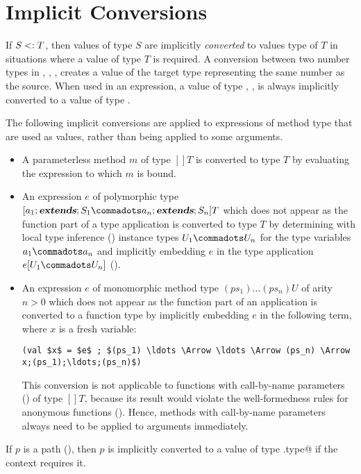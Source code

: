 \documentclass[11pt]{report}
\begin{document}
\section{Implicit Conversions}
\label{sec:impl-conv}

If $S <: T$, then values of type $S$ are implicitly {\em
converted} to values type of $T$ in situations where a value of type
$T$ is required. A conversion between two number types in \verb@Int@,
\verb@Long@, \verb@Float@, \verb@Double@ creates a value of the target
type representing the same number as the source.  When used in an
expression, a value of type \verb@Byte@, \verb@Char@, \verb@Short@ is
always implicitly converted to a value of type \verb@Int@.

The following implicit conversions are applied to expressions of
method type that are used as values, rather than being applied to some
arguments.
\begin{itemize}
\item
A parameterless method $m$ of type $[] T$
is converted to type $T$ by evaluating the expression to which $m$ is bound.
\item
An expression $e$ of polymorphic type $[a_1 \extends S_1 \commadots
a_n \extends S_n]T$ which does not appear as the function part of
a type application is converted to type $T$
by determining with local type inference
() instance types $U_1
\commadots U_n$ for the type variables $a_1 \commadots a_n$ and
implicitly embedding $e$ in the type application
$e[U_1 \commadots U_n]$ ().
\item
An expression $e$ of monomorphic method type
$(ps_1) \ldots (ps_n) U$ of arity $n > 0$
which does not appear as the function part of an application is
converted to a function type by implicitly embedding $e$ in
the following term, where $x$ is a fresh variable:
\begin{verbatim}
(val $x$ = $e$ ; $(ps_1) \ldots \Arrow \ldots \Arrow (ps_n) \Arrow x;(ps_1);\ldots;(ps_n)$)
\end{verbatim}
This conversion is not applicable to functions with call-by-name
parameters () of type $[]T$, because its result
would violate the well-formedness rules for anonymous functions
(). Hence, methods with call-by-name
parameters always need to be applied to arguments immediately.
\end{itemize}

If $p$ is a path (), then $p$ is implicitly converted to a
value of type \verb@p.type@ if the context requires it.
\end{document}
